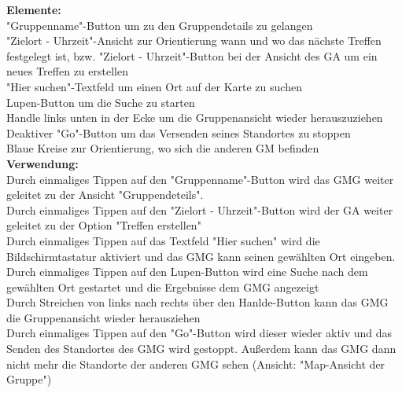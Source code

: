 \textbf{Elemente:}\\
"Gruppenname"-Button um zu den Gruppendetails zu gelangen\\
"Zielort - Uhrzeit"-Ansicht zur Orientierung wann und wo das nächste Treffen festgelegt ist, bzw. "Zielort - Uhrzeit"-Button bei der Ansicht des GA um ein neues Treffen zu erstellen\\
"Hier suchen"-Textfeld um einen Ort auf der Karte zu suchen\\
Lupen-Button um die Suche zu starten\\
Handle links unten in der Ecke um die Gruppenansicht wieder herauszuziehen\\
Deaktiver "Go"-Button um das Versenden seines Standortes zu stoppen\\
Blaue Kreise zur Orientierung, wo sich die anderen GM befinden\\
\textbf{Verwendung:}\\
Durch einmaliges Tippen auf den "Gruppenname"-Button wird das GMG weiter geleitet zu der Ansicht "Gruppendeteils".\\
Durch einmaliges Tippen auf den "Zielort - Uhrzeit"-Button wird der GA weiter geleitet zu der Option "Treffen erstellen"\\
Durch einmaliges Tippen auf das Textfeld "Hier suchen" wird die Bildschirmtastatur aktiviert und das GMG kann seinen gewählten Ort eingeben.\\
Durch einmaliges Tippen auf den Lupen-Button wird eine Suche nach dem gewählten Ort gestartet und die Ergebnisse dem GMG angezeigt\\
Durch Streichen von links nach rechts über den Hanlde-Button kann das GMG die Gruppenansicht wieder herausziehen\\
Durch einmaliges Tippen auf den "Go"-Button wird dieser wieder aktiv und das Senden des Standortes des GMG wird gestoppt. Außerdem kann das GMG dann nicht mehr die Standorte der anderen GMG sehen (Ansicht: "Map-Ansicht der Gruppe")\\ \\
